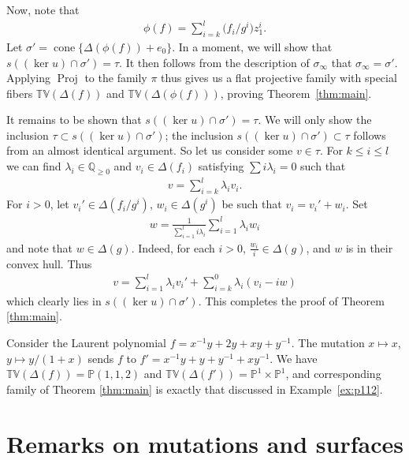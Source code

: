\documentclass[pdftex]{sigma}
\newcommand{\QQ}{\mathbb{Q}}
\newcommand{\PP}{\mathbb{P}}
\newcommand{\tv}{\mathbb{TV}}
\DeclareMathOperator{\Proj}{Proj}
\DeclareMathOperator{\cone}{cone}
\begin{document}
Now, note that
\begin{gather*}
\phi(f)=\sum_{i=k}^l \big(f_i/g^i\big)z_1^i.
\end{gather*}
Let $\sigma'=\cone\{\Delta(\phi(f))+e_0\}$. In a moment, we will show that $s( (\ker u)\cap \sigma')=\tau$. It then follows from the description of $\sigma_\infty$ that $\sigma_\infty=\sigma'$. Applying $\Proj$ to the family $\pi$ thus gives us a f\/lat projective family with special f\/ibers $\tv(\Delta(f))$ and $\tv(\Delta(\phi(f)))$, proving Theorem~\ref{thm:main}.

It remains to be shown that $s( (\ker u)\cap \sigma')=\tau$. We will only show the inclusion $\tau \subset s( (\ker u)\cap \sigma')$; the inclusion $s( (\ker u)\cap \sigma')\subset \tau$ follows from an almost identical argument. So let us consider some $v\in\tau$. For $k\leq i \leq l$ we can f\/ind $\lambda_i\in\QQ_{\geq 0}$ and $v_i\in\Delta(f_i)$ satisfying $\sum i\lambda_i=0$ such that
\begin{gather*}
v=\sum_{i=k}^l \lambda_i v_i.
\end{gather*}
For $i>0$, let $v_i'\in\Delta(f_i/g^i)$, $w_i\in\Delta(g^i)$ be such that $v_i=v_i'+w_i$.
Set
\begin{gather*}
w=\frac{1}{\sum\limits_{i=1}^l i \lambda_i}
\sum\limits_{i=1}^l{\lambda_i w_i}\end{gather*}
and note that $w\in\Delta(g)$.
Indeed, for each $i>0$, $\frac{w_i}{i}\in\Delta(g)$, and $w$ is in their convex hull.
Thus
\begin{gather*}
v=\sum_{i=1}^l \lambda_i v_i'+\sum_{i=k}^0 \lambda_i(v_i-iw)
\end{gather*}
which clearly lies in $s( (\ker u)\cap \sigma')$. This completes the proof of Theorem \ref{thm:main}.
\begin{Example}
	Consider the Laurent polynomial $f=x^{-1}y+2y+xy+y^{-1}$. The mutation $x\mapsto x$, $y\mapsto y/(1+x)$ sends $f$ to $f'=x^{-1}y+y+y^{-1}+xy^{-1}$. We have $\tv(\Delta(f))=\PP(1,1,2)$ and $\tv(\Delta(f'))=\PP^1\times\PP^1$, and corresponding family of Theorem \ref{thm:main} is exactly that discussed in Example~\ref{ex:p112}.
\end{Example}

\section{Remarks on mutations and surfaces}\label{sec:surfaces}
\end{document}
